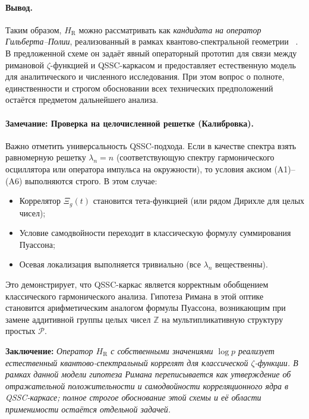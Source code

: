 \documentclass{article}
\numberwithin{equation}{section}
\theoremstyle{plain}
\theoremstyle{definition}
\theoremstyle{remark}
\begin{document}
\paragraph{Вывод.}
Таким образом, $H_{\mathrm{R}}$ можно рассматривать как
\emph{кандидата на оператор Гильберта–Полии}, реализованный
в рамках квантово-спектральной геометрии ~\cite{Odlyzko1987}.
В предложенной схеме он задаёт явный операторный прототип для
связи между римановой $\zeta$-функцией и QSSC-каркасом и предоставляет
естественную модель для аналитического и численного исследования.
При этом вопрос о полноте, единственности и строгом обосновании
всех технических предположений остаётся предметом дальнейшего анализа.

\paragraph{Замечание: Проверка на целочисленной решетке (Калибровка).}
Важно отметить универсальность QSSC-подхода. Если в качестве спектра взять
равномерную решетку $\lambda_n = n$ (соответствующую спектру гармонического осциллятора
или оператора импульса на окружности), то условия аксиом (A1)–(A6) выполняются строго.
В этом случае:
\begin{itemize}
  \item Коррелятор $\Xi_g(t)$ становится тета-функцией (или рядом Дирихле для целых чисел);
  \item Условие самодвойности переходит в классическую формулу суммирования Пуассона;
  \item Осевая локализация выполняется тривиально (все $\lambda_n$ вещественны).
\end{itemize}
Это демонстрирует, что QSSC-каркас является корректным обобщением
классического гармонического анализа. Гипотеза Римана в этой оптике
становится арифметическим аналогом формулы Пуассона, возникающим при замене
аддитивной группы целых чисел $\mathbb{Z}$ на мультипликативную структуру простых $\mathcal{P}$.

\begin{center}
\textbf{Заключение:}
\textit{
Оператор $H_{\mathrm{R}}$ с собственными значениями $\log p$
реализует естественный квантово-спектральный коррелят для
классической $\zeta$-функции.
В рамках данной модели гипотеза Римана переписывается как
утверждение об отражательной положительности и самодвойности
корреляционного ядра в QSSC-каркасе; полное строгое обоснование
этой схемы и её области применимости остаётся отдельной задачей.
}
\end{center}
\end{document}
